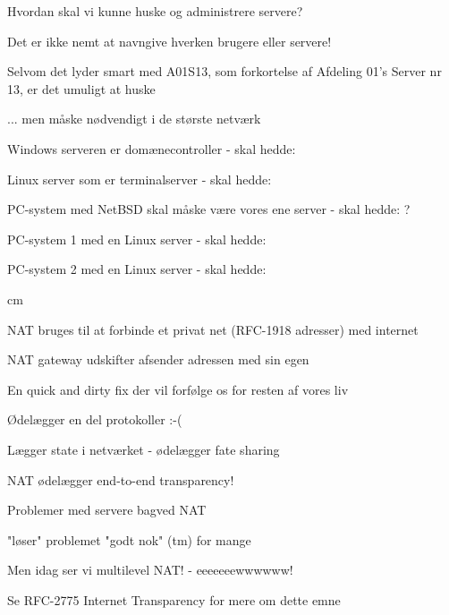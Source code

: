\begin{list1}
  \item Hvordan skal vi kunne huske og administrere servere?
\item Det er ikke nemt at navngive hverken brugere eller servere!
\item Selvom det lyder smart med A01S13, som forkortelse af Afdeling
  01's Server nr 13, er det umuligt at huske
\item ... men måske nødvendigt i de største netværk
  \begin{list2}
  
\item Windows serveren er domænecontroller - skal hedde:
\item Linux server som er terminalserver - skal hedde:
\item PC-system med NetBSD skal måske være vores ene server - skal hedde: ?
\item PC-system 1 med en Linux server - skal hedde: 
\item PC-system 2 med en Linux server - skal hedde:
  \end{list2}
\end{list1}





 cm
\begin{list2}
\item NAT bruges til at forbinde et privat net (RFC-1918 adresser) med internet
\item NAT gateway udskifter afsender adressen med sin egen
\item En quick and dirty fix der vil forfølge os for resten af vores
  liv 
\item Ødelægger en del protokoller :-(
\item Lægger state i netværket - ødelægger fate sharing  
\end{list2}








\begin{list2}
\item NAT ødelægger end-to-end transparency!
\item Problemer med servere bagved NAT
\item "løser" problemet "godt nok" (tm) for mange
\item Men idag ser vi multilevel NAT! - eeeeeeewwwwww!
\item Se RFC-2775 Internet Transparency for mere om dette emne
\end{list2}



